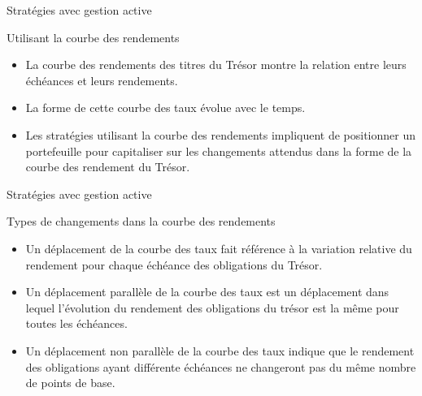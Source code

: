 \documentclass{beamer}
\begin{document}
\begin{frame}{Stratégies avec gestion active}
\begin{block}{Utilisant la courbe des rendements}
\begin{itemize}[label=\bullet]
\item La courbe des rendements des titres du Trésor montre la relation entre leurs échéances et leurs rendements.
\item La forme de cette courbe des taux évolue avec le temps.
\item Les stratégies utilisant la courbe des rendements impliquent de positionner un portefeuille pour capitaliser sur les changements attendus dans la forme de la courbe des rendement du Trésor.
\end{itemize}
\end{block}
\end{frame}


\begin{frame}{Stratégies avec gestion active}
\begin{block}{Types de changements dans la courbe des rendements}
\begin{itemize}[label=\bullet]
\item Un déplacement de la courbe des taux fait référence à la variation relative du rendement pour chaque échéance des obligations du Trésor.
\item Un déplacement parallèle de la courbe des taux est un déplacement dans lequel l'évolution du rendement des obligations du trésor est la même pour toutes les échéances.
\item Un déplacement non parallèle de la courbe des taux indique que le rendement des obligations ayant différente échéances ne changeront pas du même nombre de points de base.
\end{itemize}
\end{block}
\end{frame}
\end{document}
